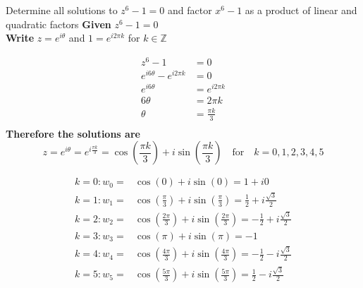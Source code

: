 \documentclass[a4paper, 8pt]{extarticle}
\begin{document}
\begin{examplebox}{Determine all solutions to $z^6 -1 = 0$ and factor $x^6-1$ as a product of linear and quadratic factors}{}
	\label{sol:2023Q1b}
	\textbf{Given} $z^6 -1 = 0$ \\
	\textbf{Write} $z = e^{i \theta}$ and $1 = e^{i 2 \pi k}$ for $k \in \mathbb{Z}$

	\begin{align*}
		z^6 -1                         & = 0               \\
		e^{i 6 \theta} - e^{i 2 \pi k} & = 0               \\
		e^{i 6 \theta}                 & = e^{i 2 \pi k}   \\
		6 \theta                       & = 2 \pi k         \\
		\theta                         & = \frac{\pi k}{3} \\
	\end{align*}
	\textbf{Therefore the solutions are}
	$$z = e^{i \theta} = e^{i \frac{\pi k}{3}} = \cos\left(\frac{\pi k}{3}\right) + i\sin\left(\frac{\pi k}{3}\right) \quad \text{for} \quad k = 0, 1, 2, 3, 4, 5$$

	\begin{minipage}{0.49\textwidth}
		\begin{align*}
			k = 0 : w_0 =  & \cos\left(0\right) + i\sin\left(0\right) = 1 + i0                                                       \\
			k = 1 : w_1 =  & \cos\left(\frac{\pi}{3}\right) + i\sin\left(\frac{\pi}{3}\right)    = \frac{1}{2} + i\frac{\sqrt{3}}{2} \\
			k = 2 : w_2  = & \cos\left(\frac{2\pi}{3}\right) + i\sin\left(\frac{2\pi}{3}\right) = -\frac{1}{2} + i\frac{\sqrt{3}}{2} \\
			k = 3 : w_3 =  & \cos\left(\pi\right) + i\sin\left(\pi\right)                        = -1                                \\
			k = 4 : w_4 =  & \cos\left(\frac{4\pi}{3}\right) + i\sin\left(\frac{4\pi}{3}\right) = -\frac{1}{2} - i\frac{\sqrt{3}}{2} \\
			k = 5 : w_5 =  & \cos\left(\frac{5\pi}{3}\right) + i\sin\left(\frac{5\pi}{3}\right) = \frac{1}{2} - i\frac{\sqrt{3}}{2}  \\
		\end{align*}
	\end{minipage}
	\begin{minipage}{0.5\textwidth}
		\begin{center}
\end{center}
\end{minipage}
\end{examplebox}
\end{document}
